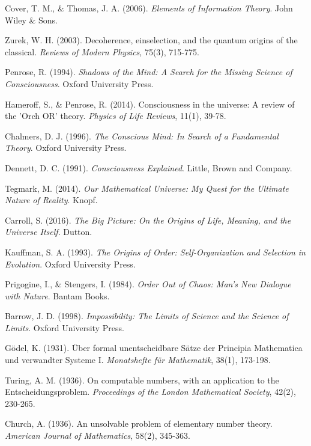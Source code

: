 \documentclass[11pt,a4paper]{article}
\theoremstyle{remark}
\begin{document}
\begin{thebibliography}{99}
Cover, T. M., \& Thomas, J. A. (2006). \textit{Elements of Information Theory}. John Wiley \& Sons.

Zurek, W. H. (2003). Decoherence, einselection, and the quantum origins of the classical. \textit{Reviews of Modern Physics}, 75(3), 715-775.

Penrose, R. (1994). \textit{Shadows of the Mind: A Search for the Missing Science of Consciousness}. Oxford University Press.

Hameroff, S., \& Penrose, R. (2014). Consciousness in the universe: A review of the 'Orch OR' theory. \textit{Physics of Life Reviews}, 11(1), 39-78.

Chalmers, D. J. (1996). \textit{The Conscious Mind: In Search of a Fundamental Theory}. Oxford University Press.

Dennett, D. C. (1991). \textit{Consciousness Explained}. Little, Brown and Company.

Tegmark, M. (2014). \textit{Our Mathematical Universe: My Quest for the Ultimate Nature of Reality}. Knopf.

Carroll, S. (2016). \textit{The Big Picture: On the Origins of Life, Meaning, and the Universe Itself}. Dutton.

Kauffman, S. A. (1993). \textit{The Origins of Order: Self-Organization and Selection in Evolution}. Oxford University Press.

Prigogine, I., \& Stengers, I. (1984). \textit{Order Out of Chaos: Man's New Dialogue with Nature}. Bantam Books.

Barrow, J. D. (1998). \textit{Impossibility: The Limits of Science and the Science of Limits}. Oxford University Press.

Gödel, K. (1931). Über formal unentscheidbare Sätze der Principia Mathematica und verwandter Systeme I. \textit{Monatshefte für Mathematik}, 38(1), 173-198.

Turing, A. M. (1936). On computable numbers, with an application to the Entscheidungsproblem. \textit{Proceedings of the London Mathematical Society}, 42(2), 230-265.

Church, A. (1936). An unsolvable problem of elementary number theory. \textit{American Journal of Mathematics}, 58(2), 345-363.


\end{thebibliography}
\end{document}
